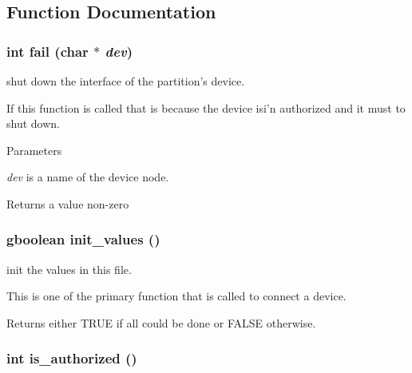 \subsection{Function Documentation}
\hypertarget{usb-control_8c_ab9932ed1777b7d0acf1e366fdd73ef3e}{
\subsubsection[{fail}]{\setlength{\rightskip}{0pt plus 5cm}int fail (char $\ast$ {\em dev})}}
\label{usb-control_8c_ab9932ed1777b7d0acf1e366fdd73ef3e}


shut down the interface of the partition's device. 

If this function is called that is because the device isi'n authorized and it must to shut down. 
\begin{DoxyParams}{Parameters}
\item[{\em dev}]is a name of the device node. \end{DoxyParams}
\begin{DoxyReturn}{Returns}
a value non-\/zero 
\end{DoxyReturn}
\hypertarget{usb-control_8c_abc3e9b8557ead2451394660134b421f7}{
\subsubsection[{init\_\-values}]{\setlength{\rightskip}{0pt plus 5cm}gboolean init\_\-values ()}}
\label{usb-control_8c_abc3e9b8557ead2451394660134b421f7}


init the values in this file. 

This is one of the primary function that is called to connect a device. \begin{DoxyReturn}{Returns}
either TRUE if all could be done or FALSE otherwise. 
\end{DoxyReturn}
\hypertarget{usb-control_8c_a07d78dafcde5f5109f5cebe323b1d401}{
\subsubsection[{is\_\-authorized}]{\setlength{\rightskip}{0pt plus 5cm}int is\_\-authorized ()}}
\label{usb-control_8c_a07d78dafcde5f5109f5cebe323b1d401}


